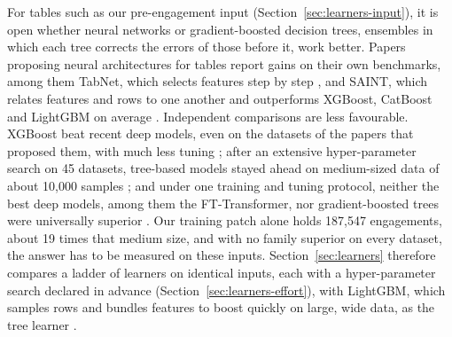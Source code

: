 For tables such as our pre-engagement input (Section~\ref{sec:learners-input}), it is open whether
neural networks or gradient-boosted decision trees, ensembles in which each tree corrects the errors
of those before it, work better. Papers proposing neural architectures for tables report gains on their
own benchmarks, among them TabNet, which selects features step by step
\cite{arik2021tabnet}, and SAINT, which relates features and rows to one another and outperforms
XGBoost, CatBoost and LightGBM on average \cite{somepalli2021saint}.
Independent comparisons are less favourable. XGBoost beat recent deep models, even on the datasets of
the papers that proposed them, with much less tuning \cite{shwartzziv2022tabular}; after an extensive
hyper-parameter search on 45 datasets, tree-based models stayed ahead on medium-sized data of about
10,000 samples \cite{grinsztajn2022tree}; and under one training and tuning protocol, neither the best
deep models, among them the FT-Transformer, nor gradient-boosted trees were universally superior
\cite{gorishniy2021revisiting}. Our training patch alone holds 187,547 engagements, about 19 times that
medium size, and with no family superior on every dataset, the answer has to be measured on these
inputs. Section~\ref{sec:learners} therefore compares
a ladder of learners on identical inputs, each with a hyper-parameter search declared in advance
(Section~\ref{sec:learners-effort}), with LightGBM, which samples rows and bundles features to boost
quickly on large, wide data, as the tree learner \cite{ke2017lightgbm}.
